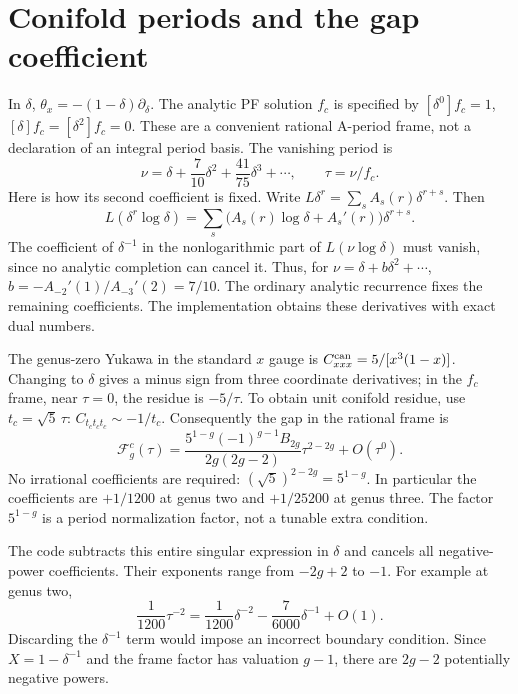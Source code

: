 \documentclass[11pt]{article}
\begin{document}
\section{Conifold periods and the gap coefficient}
In $\delta$, $\theta_x=-(1-\delta)\partial_\delta$.
The analytic PF solution $f_c$ is specified by
$[\delta^0]f_c=1$, $[\delta]f_c=[\delta^2]f_c=0$.
These are a convenient rational A-period frame, not a declaration of an integral
period basis. The vanishing period is
\[
 \nu=\delta+\frac7{10}\delta^2+\frac{41}{75}\delta^3+\cdots,
 \qquad \tau=\nu/f_c.
\]
Here is how its second coefficient is fixed. Write
$L\delta^r=\sum_s A_s(r)\delta^{r+s}$.
Then
\[
 L(\delta^r\log\delta)=
 \sum_s\bigl(A_s(r)\log\delta+A_s'(r)\bigr)\delta^{r+s}.
\]
The coefficient of $\delta^{-1}$ in the nonlogarithmic part of
$L(\nu\log\delta)$ must vanish, since no analytic completion can cancel it.
Thus, for $\nu=\delta+b\delta^2+\cdots$,
$b=-A_{-2}'(1)/A_{-3}'(2)=7/10$.
The ordinary analytic recurrence fixes the remaining coefficients.
The implementation obtains these derivatives with exact dual numbers.

The genus-zero Yukawa in the standard $x$ gauge is
$C_{xxx}^{\rm can}=5/[x^3(1-x)]$.
Changing to $\delta$ gives a minus sign from three coordinate derivatives;
in the $f_c$ frame, near $\tau=0$, the residue is $-5/\tau$.
To obtain unit conifold residue, use $t_c=\sqrt5\,\tau$:
$C_{t_ct_ct_c}\sim-1/t_c$.
Consequently the gap in the rational frame is
\[
 \mathcal F_g^c(\tau)=
 \frac{5^{1-g}(-1)^{g-1}B_{2g}}{2g(2g-2)}
 \tau^{2-2g}+O(\tau^0).
\]
No irrational coefficients are required: $(\sqrt5)^{2-2g}=5^{1-g}$.
In particular the coefficients are $+1/1200$ at genus two and $+1/25200$
at genus three. The factor $5^{1-g}$ is a period normalization factor,
not a tunable extra condition.

The code subtracts this entire singular expression in $\delta$ and cancels
all negative-power coefficients. Their exponents range from $-2g+2$ to $-1$.
For example at genus two,
\[
 \frac1{1200}\tau^{-2}=
 \frac1{1200}\delta^{-2}-\frac7{6000}\delta^{-1}+O(1).
\]
Discarding the $\delta^{-1}$ term would impose an incorrect boundary condition.
Since $X=1-\delta^{-1}$ and the frame factor has valuation $g-1$,
there are $2g-2$ potentially negative powers.
\end{document}
